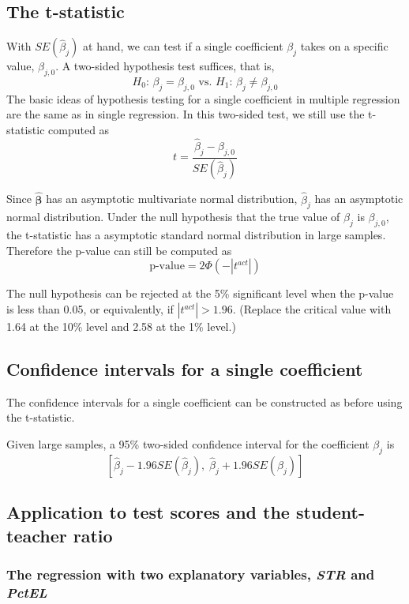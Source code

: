 \documentclass[a4paper,11pt]{article}
\begin{document}
\subsection{The t-statistic}
\label{sec:org2d0dc32}

With \(SE(\hat{\beta}_j)\) at hand, we can test if a single coefficient
\(\beta_j\) takes on a specific value, \(\beta_{j,0}\). A two-sided
hypothesis test suffices, that is,
\[ H_0:\, \beta_j = \beta_{j,0} \text{ vs. } H_1:\, \beta_j \neq
\beta_{j,0} \]
The basic ideas of hypothesis testing for a single coefficient in
multiple regression are the same as in single regression.  In this
two-sided test, we still use the t-statistic computed as
\[ t = \frac{\hat{\beta}_j - \beta_{j,0}}{SE(\hat{\beta}_j)} \]

Since \(\boldsymbol{\hat{\beta}}\) has an asymptotic multivariate normal
distribution, \(\hat{\beta}_j\) has an asymptotic normal
distribution. Under the null hypothesis that the true value of
\(\beta_j\) is \(\beta_{j,0}\), the t-statistic has a asymptotic standard
normal distribution in large samples. Therefore the p-value can still
be computed as
\[ \text{p-value} = 2\varPhi(-|t^{act}|) \]

The null hypothesis can be rejected at the 5\% significant level when
the p-value is less than 0.05, or equivalently, if \(|t^{act}| >
1.96\). (Replace the critical value with 1.64 at the 10\% level and 2.58
at the 1\% level.)


\subsection{Confidence intervals for a single coefficient}
\label{sec:orgf5a9293}

The confidence intervals for a single coefficient can be constructed
as before using the t-statistic.

Given large samples, a 95\% two-sided confidence interval for the
coefficient \(\beta_j\) is
\[ \left[\hat{\beta}_j - 1.96 SE(\hat{\beta}_j),\; \hat{\beta}_j +
1.96 SE(\hat{\beta}_j)\right] \]


\subsection{Application to test scores and the student-teacher ratio}
\label{sec:org341ccde}

\subsubsection*{The regression with two explanatory variables, \emph{STR} and \emph{PctEL}}
\label{sec:orga0ec756}
\end{document}
